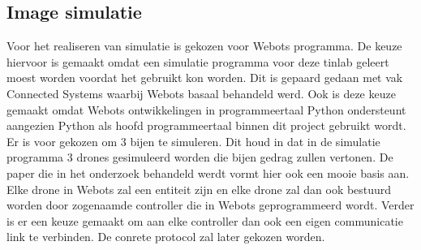 \subsection{Image simulatie}
Voor het realiseren van simulatie is gekozen voor Webots programma. De keuze hiervoor is gemaakt omdat
een simulatie programma  voor deze tinlab geleert moest worden voordat het gebruikt kon worden. 
Dit is gepaard gedaan met vak Connected Systems waarbij Webots basaal behandeld werd. Ook is deze keuze
gemaakt omdat Webots ontwikkelingen in programmeertaal Python ondersteunt aangezien Python als hoofd programmeertaal
binnen dit project gebruikt wordt. Er is voor gekozen om 3 bijen te simuleren. Dit houd in dat in de simulatie programma
3 drones gesimuleerd worden die bijen gedrag zullen vertonen. De paper die in het onderzoek behandeld werdt vormt
hier ook een mooie basis aan. Elke drone in Webots zal een entiteit zijn en elke drone zal dan ook bestuurd worden
door zogenaamde controller die in Webots geprogrammeerd wordt. Verder is er een keuze gemaakt om aan elke controller
dan ook een eigen communicatie link te verbinden. De conrete protocol zal later gekozen worden.